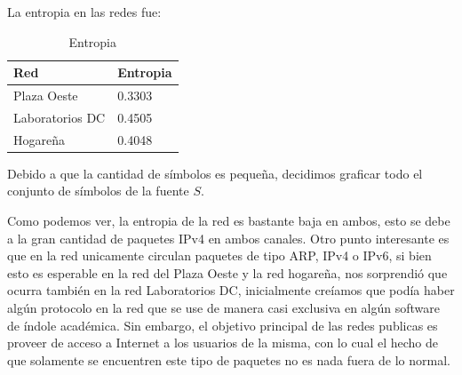 %
%
%

La entropia en las redes fue:

\begin{table}[H]
\centering
\caption{Entropia}
\label{my-label}
\begin{tabular}{ll}
\hline
Red         & Entropia \\ \hline
Plaza Oeste & 0.3303   \\
Laboratorios DC    & 0.4505   \\ 
Hogareña & 0.4048   \\  \hline
\end{tabular}
\end{table}

Debido a que la cantidad de símbolos es pequeña, decidimos graficar todo el conjunto de símbolos de la fuente $S$.

Como podemos ver, la entropia de la red es bastante baja en ambos, esto se debe a la gran cantidad de paquetes IPv4 en ambos canales. Otro punto interesante es que en la red unicamente circulan paquetes de tipo ARP, IPv4 o IPv6, si bien esto es esperable en la red del Plaza Oeste y la red hogareña, nos sorprendió que ocurra también en la red Laboratorios DC, inicialmente creíamos que podía haber algún protocolo en la red que se use de manera casi exclusiva en algún software de índole académica. Sin embargo, el objetivo principal de las redes publicas es proveer de acceso a Internet a los usuarios de la misma, con lo cual el hecho de que solamente se encuentren este tipo de paquetes no es nada fuera de lo normal.

